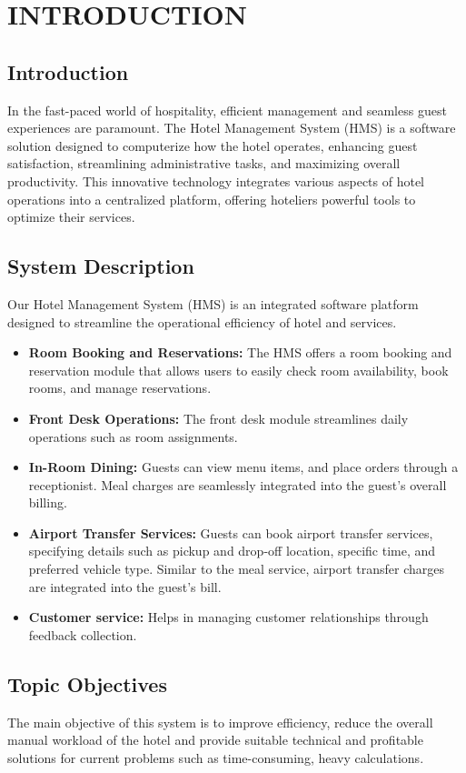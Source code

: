 \chapter{INTRODUCTION}
    \section{Introduction}
    In the fast-paced world of hospitality, efficient management and seamless guest experiences are paramount. The Hotel Management System (HMS) is a software solution designed to computerize how the hotel operates, enhancing guest satisfaction, streamlining administrative tasks, and maximizing overall productivity. This innovative technology integrates various aspects of hotel operations into a centralized platform, offering hoteliers powerful tools to optimize their services.
    \section{System Description}
    Our Hotel Management System (HMS) is an integrated software platform designed to streamline the operational efficiency of hotel and services. 
    \begin{itemize}
        \item \textbf{Room Booking and Reservations:} The HMS offers a room booking and reservation module that allows users to easily check room availability, book rooms, and manage reservations. 
        \item \textbf{Front Desk Operations:} The front desk module streamlines daily operations such as room assignments.
        \item \textbf{In-Room Dining:} Guests can view menu items, and place orders through a receptionist. Meal charges are seamlessly integrated into the guest’s overall billing.
        \item \textbf{Airport Transfer Services:} Guests can book airport transfer services, specifying details such as pickup and drop-off location, specific time, and preferred vehicle type. Similar to the meal service, airport transfer charges are integrated into the guest's bill.
        \item \textbf{Customer service:} Helps in managing customer relationships through feedback collection.
    \end{itemize}
    \section{Topic Objectives}
    The main objective of this system is to improve efficiency, reduce the overall manual workload of the hotel and provide suitable technical and profitable solutions for current problems such as time-consuming, heavy calculations. 
    
